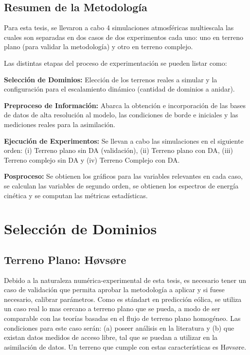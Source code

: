 \subsection{Resumen de la Metodología}
Para esta tesis, se llevaron a cabo 4 simulaciones atmosféricas multiescala las cuales son separadas en dos casos de dos experimentos cada uno: uno en terreno plano (para validar la metodología) y otro en terreno complejo.

Las distintas etapas del proceso de experimentación se pueden listar como:
\begin{enumerate*}
	\item \textbf{Selección de Dominios: } Elección de los terrenos reales a simular y la configuración para el escalamiento dinámico (cantidad de dominios a anidar).
	\item \textbf{Preproceso de Información:} Abarca la obtención e incorporación de las bases de datos de alta resolución al modelo, las condiciones de borde e iniciales y las mediciones reales para la asimilación.
	\item \textbf{Ejecución de Experimentos:} Se llevan a cabo las simulaciones en el siguiente orden: (i) Terreno plano sin DA (validación), (ii) Terreno plano con DA, (iii) Terreno complejo sin DA y (iv) Terreno Complejo con DA.
	\item \textbf{Posproceso:} Se obtienen los gráficos para las variables relevantes en cada caso, se calculan las variables de segundo orden, se obtienen los espectros de energía cinética y se computan las métricas estadísticas.
\end{enumerate*}
\newpage
\section{Selección de Dominios}
\subsection{Terreno Plano: Høvsøre}
 Debido a la naturaleza numérica-experimental de esta tesis, es necesario tener un caso de validación que permita aprobar la metodología a aplicar y si fuese necesario, calibrar parámetros. Como es stándart en predicción eólica, se utiliza un caso real lo mas cercano a terreno plano que se pueda, a modo de ser comparable con las teorías basadas en el flujo de terreno plano homogéneo. Las condiciones para este caso serán: (a) poseer análisis en la literatura y (b) que existan datos medidos de acceso libre, tal que se puedan a utilizar en la asimilación de datos. Un terreno que cumple con estas características es Høvsøre.

